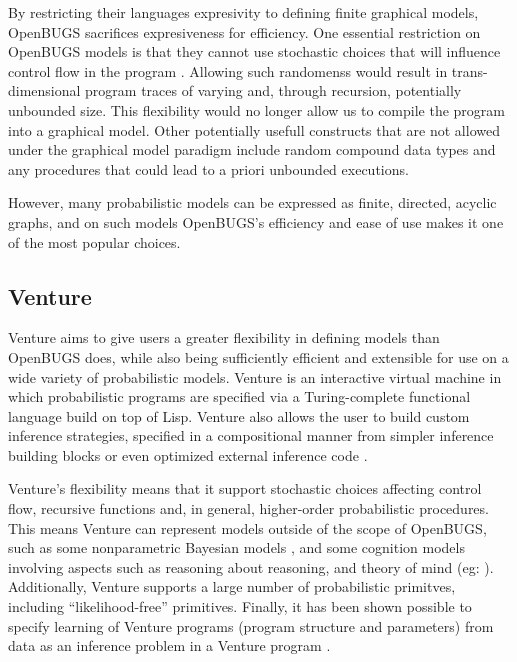 By restricting their languages expresivity to defining finite graphical models, OpenBUGS sacrifices expresiveness for efficiency. One essential restriction on OpenBUGS models is that they cannot use stochastic choices that will influence control flow in the program \cite{lunn2009bugs}. Allowing such randomenss would result in trans-dimensional program traces of varying and, through recursion, potentially unbounded size. This flexibility would no longer allow us to compile the program into a graphical model. Other potentially usefull constructs that are not allowed under the graphical model paradigm include random compound data types and any procedures that could lead to a priori unbounded executions.

However, many probabilistic models can be expressed as finite, directed, acyclic graphs, and on such models OpenBUGS's efficiency and ease of use makes it one of the most popular choices.

\subsection{Venture}

Venture aims to give users a greater flexibility in defining models than OpenBUGS does, while also being sufficiently efficient and extensible for use on a wide variety of probabilistic models. Venture is an interactive virtual machine in which probabilistic programs are specified via a Turing-complete functional language build on top of Lisp. Venture also allows the user to build custom inference strategies, specified in a compositional manner from simpler inference building blocks or even optimized external inference code \cite{mansinghka2014venture}. 

Venture's flexibility means that it support stochastic choices affecting control flow, recursive functions and, in general, higher-order probabilistic procedures. This means Venture can represent models outside of the scope of OpenBUGS, such as some nonparametric Bayesian models \cite{roy2008stochastic}, and some cognition models involving aspects such as reasoning about reasoning, and theory of mind (eg: \cite{probMods, gerstenberg2012ping}). Additionally, Venture supports a large number of probabilistic primitves, including ``likelihood-free'' primitives. Finally, it has been shown possible to specify learning of Venture programs (program structure and parameters) from data as an inference problem in a Venture program \cite{mansinghka2009natively}.

